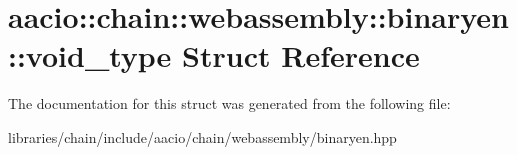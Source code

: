 \hypertarget{structaacio_1_1chain_1_1webassembly_1_1binaryen_1_1void__type}{}\section{aacio\+:\+:chain\+:\+:webassembly\+:\+:binaryen\+:\+:void\+\_\+type Struct Reference}
\label{structaacio_1_1chain_1_1webassembly_1_1binaryen_1_1void__type}


The documentation for this struct was generated from the following file\+:\begin{DoxyCompactItemize}
\item 
libraries/chain/include/aacio/chain/webassembly/binaryen.\+hpp\end{DoxyCompactItemize}
